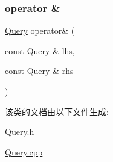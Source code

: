 \subsubsection{\texorpdfstring{operator \&}{operator \&}}
{\footnotesize\ttfamily \hyperlink{classQuery}{Query} operator\& (\begin{DoxyParamCaption}\item[{const \hyperlink{classQuery}{Query} \&}]{lhs,  }\item[{const \hyperlink{classQuery}{Query} \&}]{rhs }\end{DoxyParamCaption})\hspace{0.3cm}{\ttfamily [friend]}}



该类的文档由以下文件生成\+:\begin{DoxyCompactItemize}
\item 
\hyperlink{Query_8h}{Query.\+h}\item 
\hyperlink{Query_8cpp}{Query.\+cpp}\end{DoxyCompactItemize}
